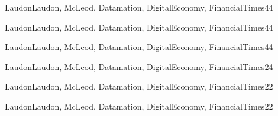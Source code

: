 \begin{syllabus}
\begin{unit}{\SPSecurityOperationsDef}{LaudonLaudon, McLeod, Datamation, DigitalEconomy, FinancialTimes}{4}{4}
	\SPSecurityOperationsAllTopics
	\SPSecurityOperationsAllObjectives
\end{unit}

\begin{unit}{\SPIntellectualPropertyDef}{LaudonLaudon, McLeod, Datamation, DigitalEconomy, FinancialTimes}{4}{4}
	\SPIntellectualPropertyAllTopics
	\SPIntellectualPropertyAllObjectives
\end{unit}

\begin{unit}{\SPPrivateAndCivilLibertiesDef}{LaudonLaudon, McLeod, Datamation, DigitalEconomy, FinancialTimes}{4}{4}
	\SPPrivateAndCivilLibertiesAllTopics
	\SPPrivateAndCivilLibertiesAllObjectives
\end{unit}

\begin{unit}{\SPComputerCrimeDef}{LaudonLaudon, McLeod, Datamation, DigitalEconomy, FinancialTimes}{2}{4}
	\SPComputerCrimeAllTopics
	\SPComputerCrimeAllObjectives
\end{unit}

\begin{unit}{\SPEconomicsOfComputingDef}{LaudonLaudon, McLeod, Datamation, DigitalEconomy, FinancialTimes}{2}{2}
	\SPEconomicsOfComputingAllTopics
	\SPEconomicsOfComputingAllObjectives
\end{unit}

\begin{unit}{\SPPhilosophicalFrameworksDef}{LaudonLaudon, McLeod, Datamation, DigitalEconomy, FinancialTimes}{2}{2}
        \SPPhilosophicalFrameworksAllTopics
        \SPPhilosophicalFrameworksAllObjectives
\end{unit}



\begin{coursebibliography}
\end{coursebibliography}

\end{syllabus}
